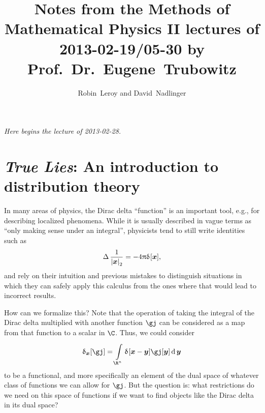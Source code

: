 \documentclass[10pt]{article}
\title{Notes from the Methods of Mathematical Physics II lectures of 2013-02-19{\slash}05-30 by Prof.~Dr.~Eugene~Trubowitz}
\author{Robin~Leroy and David~Nadlinger}
\newcommand{\Rn}{{\R^n}}
\newcommand{\lectureStart}[1]{

\begin{flushright}
\emph{Here begins the lecture of #1.}
\end{flushright}

}
\begin{document}
  \maketitle
  \lectureStart{2013-02-28}
  \section{\emph{True Lies}: An introduction to distribution theory}
  In many areas of physics, the Dirac delta ``function'' is an important tool, e.g., for describing localized phenomena. While it is usually described in vague terms as ``only making sense under an integral'', physicists tend to still write identities such as
  \begin{equation*}
    \Laplacian\frac{1}{\norm{\vx}} = -4 \Pi \DiracDelta\of\vx,
  \end{equation*}
  and rely on their intuition and previous mistakes to distinguish situations in which they can safely apply this calculus from the ones where that would lead to incorrect results.

  How can we formalize this? Note that the operation of taking the integral of the Dirac delta multiplied with another function $\gj$ can be considered as a map from that function to a scalar in $\C$. Thus, we could consider
  \begin{equation*}
    \DiracDelta[\vx]\of\gj = \int\Rn \DiracDelta\of{\vx - \vy} \gj\of\vy \diffd\vy
  \end{equation*}
  to be a functional, and more specifically an element of the dual space of whatever class of functions we can allow for $\gj$. But the question is: what restrictions do we need on this space of functions if we want to find objects like the Dirac delta in its dual space?
  
\end{document}
